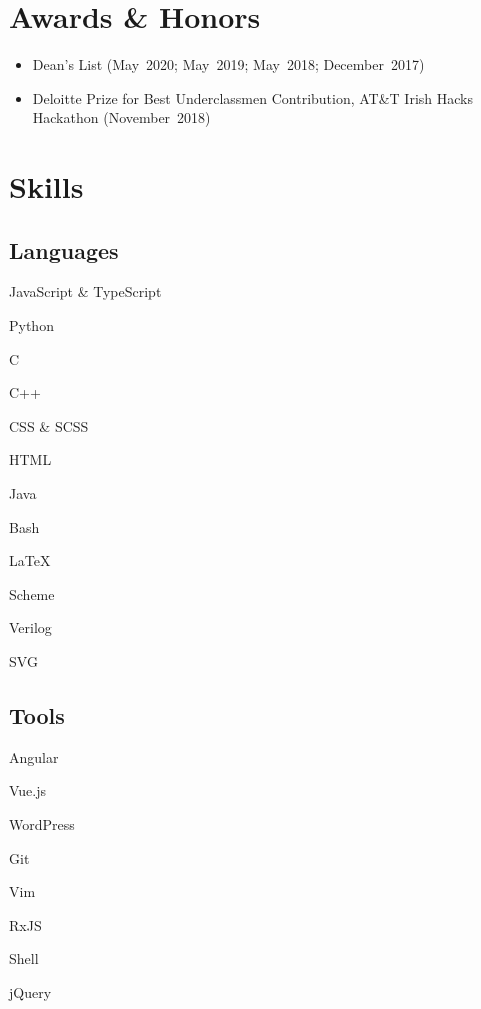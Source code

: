 \documentclass[letterpaper]{article}
\begin{document}
\begin{minipage}[t]{\dimexpr.33\textwidth-.5\columnsep}
\section{Awards \& Honors}
\begin{itemize}
    \item Dean’s List (May~2020; May~2019; May~2018; December~2017)
    \item Deloitte Prize for Best Underclassmen Contribution, AT\&T Irish Hacks Hackathon (November~2018)
\end{itemize}

\section{Skills}
\begin{minipage}[t]{.5\textwidth}

\subsection{Languages}
\begin{skillslist}
    \item JavaScript \& TypeScript
    \item Python
    \item C
    \item C++
    \item CSS \& SCSS
    \item HTML
    \item Java
    \item Bash
    \item \textrm{\LaTeX}
    \item Scheme
    \item Verilog
    \item SVG
\end{skillslist}

\end{minipage}%
\begin{minipage}[t]{.5\textwidth}

\subsection{Tools}
\begin{skillslist}
    \item Angular
    \item Vue.js
    \item WordPress
    \item Git
    \item Vim
    \item RxJS
    \item Shell
    \item jQuery
\end{skillslist}


\end{minipage}
\end{minipage}
\end{document}
